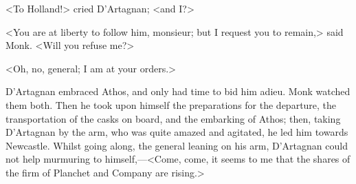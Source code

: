 <To Holland!> cried D'Artagnan; <and I\@?>

<You are at liberty to follow him, monsieur; but I request you to remain,> said Monk. <Will you refuse me?>

<Oh, no, general; I am at your orders.>

D'Artagnan embraced Athos, and only had time to bid him adieu. Monk watched them both. Then he took upon himself the preparations for the departure, the transportation of the casks on board, and the embarking of Athos; then, taking D'Artagnan by the arm, who was quite amazed and agitated, he led him towards Newcastle. Whilst going along, the general leaning on his arm, D'Artagnan could not help murmuring to himself,—<Come, come, it seems to me that the shares of the firm of Planchet and Company are rising.> 